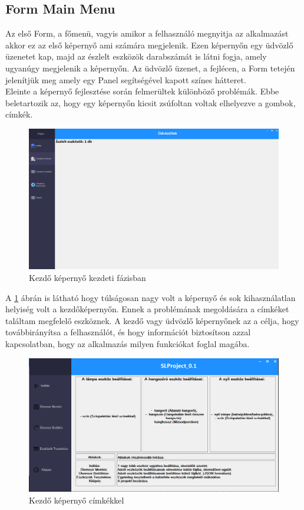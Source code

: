 \documentclass[tocnopagenum]{thesis-ekf}
\theoremstyle{definition}
\theoremstyle{remark}
\begin{document}
	\subsection{Form Main Menu}
	\label{FormMainmenu}
	Az első Form, a főmenü, vagyis amikor a felhasználó megnyitja az alkalmazást akkor ez az első képernyő ami számára megjelenik. 
	Ezen képernyőn egy üdvözlő üzenetet kap, majd az észlelt eszközök darabszámát is látni fogja, amely ugyanúgy megjelenik a képernyőn.
	Az üdvözlő üzenet, a fejlécen, a Form tetején jelenítjük meg amely egy Panel segítségével kapott színes hátteret.
	\\
	Eleinte a képernyő fejlesztése során felmerültek különböző problémák.
	Ebbe beletartozik az, hogy egy képernyőn kicsit zsúfoltan voltak elhelyezve a gombok, címkék.
	\begin{figure}[H]	
		\centering
		\includegraphics[scale=0.2]{prototipus_main_menu}
		\caption[Kezdő képernyő kezdeti fázisban]{Kezdő képernyő kezdeti fázisban}
		\label{fig:main_menu_start}
	\end{figure}
	A \ref{fig:main_menu_start} ábrán is látható hogy túlságosan nagy volt a képernyő és sok kihasználatlan helyiség volt a kezdőképernyőn.
	Ennek a problémának megoldására a címkéket találtam megfelelő eszköznek. A kezdő vagy üdvözlő képernyőnek az a célja, hogy továbbirányítsa a felhasználót, és hogy információt biztosítson azzal kapcsolatban, hogy az alkalmazás milyen funkciókat foglal magába.
	\begin{figure}[H]	
		\centering
		\includegraphics[scale=0.45]{FormMainMenu_land}
		\caption[Kezdő képernyő címkékkel]{Kezdő képernyő címkékkel}
		\label{fig:main_menu_end}
	\end{figure}
\end{document}
